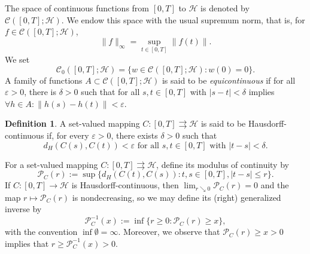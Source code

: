 \documentclass[preprint,12pt]{elsarticle}
\renewcommand{\epsilon}{\varepsilon}
\renewcommand{\H}{\mathcal{H}}
\newcommand{\tto}{\rightrightarrows}
\theoremstyle{plain}
\theoremstyle{definition}
\newtheorem{definition}[theorem]{Definition}
\theoremstyle{remark}
\begin{document}
The space of continuous functions from $[0,T]$ to $\H$ is denoted by $\mathcal{C}([0,T];\H)$. We endow this space with the usual supremum norm, that is, for $f\in \mathcal{C}([0,T];\H)$, $$\|f\|_\infty = \sup_{t\in [0,T]}\|f(t)\|.$$
We set 
\begin{equation*}
\mathcal{C}_0([0,T];\H) = \{w\in \mathcal{C}([0,T];\H):w(0) = 0\}.
\end{equation*}
A family of functions $A\subset \mathcal{C}([0,T];\H)$ is said to be \emph{equicontinuous} if for all $\epsilon>0$, there is $\delta>0$ such that for all $s,t\in [0,T]$ with $|s-t|<\delta$ implies $\forall h\in A : \|h(s)-h(t)\|< \epsilon$.
    
	\begin{definition}
		A set-valued mapping $C\colon [0,T]\tto \H$ is said to be Hausdorff-continuous if, for every $\epsilon >0$, there exists $\delta>0$ such that 
        $$
        d_H(C(s),C(t))<\epsilon \textrm{ for all } s,t\in [0,T] \text{ with } |t-s|<\delta.$$
	\end{definition}
	For a set-valued mapping $C\colon [0,T]\tto \H$, define its modulus of continuity  by
    \begin{equation}\label{mod-cont-def}
        \mathscr{P}_C(r) := \sup\{ d_H(C(t),C(s)): t,s\in [0,T], |t-s|\leq r\}.
    \end{equation}
    If $C\colon [0,T]\to \H$ is Hausdorff-continuous, then $\displaystyle\lim_{r\searrow 0} \mathscr{P}_C(r) = 0$ and the map $r\mapsto\mathscr{P}_C(r)$ is nondecreasing, so we may define its (right) generalized inverse by 
    $$\mathscr{P}_C^{-1}(x) := \inf\{ r\geq 0 : \mathscr{P}_C(r)\geq x \},$$
    with the convention $\inf \emptyset = \infty$. Moreover, we observe that $\mathscr{P}_C(r)\geq x>0$ implies that $r\geq \mathscr{P}_C^{-1}(x)>0$. 
\end{document}
